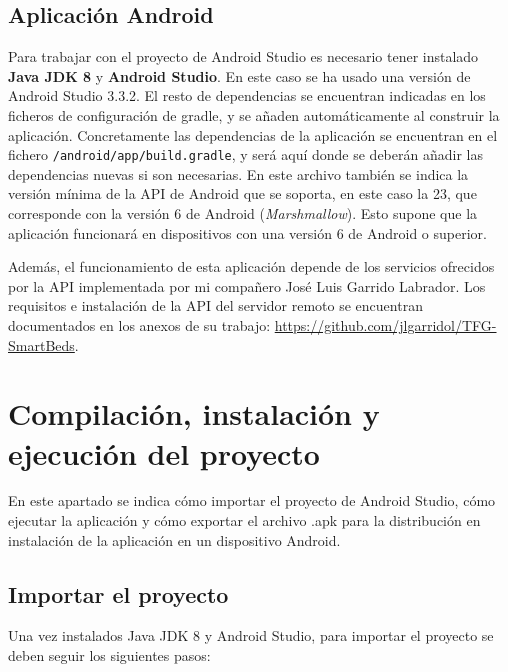 \subsection{Aplicación Android}

Para trabajar con el proyecto de Android Studio es necesario tener instalado \textbf{Java JDK 8} y \textbf{Android Studio}. En este caso se ha usado una versión de Android Studio 3.3.2. El resto de dependencias se encuentran indicadas en los ficheros de configuración de gradle, y se añaden automáticamente al construir la aplicación. Concretamente las dependencias de la aplicación se encuentran en el fichero \texttt{/android/app/build.gradle}, y será aquí donde se deberán añadir las dependencias nuevas si son necesarias. En este archivo también se indica la versión mínima de la API de Android que se soporta, en este caso la 23, que corresponde con la versión 6 de Android (\textit{Marshmallow}). Esto supone que la aplicación funcionará en dispositivos con una versión 6 de Android o superior. 

Además, el funcionamiento de esta aplicación depende de los servicios ofrecidos por la API implementada por mi compañero José Luis Garrido Labrador. Los requisitos e instalación de la API del servidor remoto se encuentran documentados en los anexos de su trabajo: \url{https://github.com/jlgarridol/TFG-SmartBeds}.

\section{Compilación, instalación y ejecución del proyecto}

En este apartado se indica cómo importar el proyecto de Android Studio, cómo ejecutar la aplicación y cómo exportar el archivo .apk para la distribución en instalación de la aplicación en un dispositivo Android. 

\subsection{Importar el proyecto}

Una vez instalados Java JDK 8 y Android Studio, para importar el proyecto se deben seguir los siguientes pasos: 

